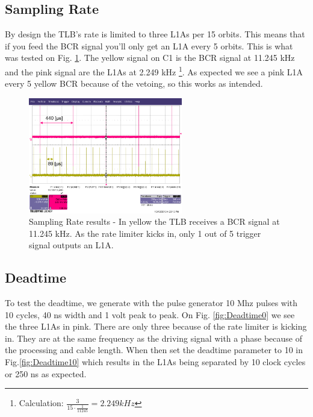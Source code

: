 \subsection{Sampling Rate}

By design the TLB's rate is limited to three L1As per 15 orbits. This means that if you feed the BCR signal you'll only get an L1A every 5 orbits. This is what was tested on Fig. \ref{fig:SamplingRate}. The yellow signal on C1 is the BCR signal at 11.245 kHz and the pink signal are the L1As at 2.249 kHz \footnote{Calculation: $\frac{3}{15\cdot\frac{1}{11245}}=2.249 kHz$}. As expected we see a pink L1A every 5 yellow BCR because of the vetoing, so this works as intended.

\begin{figure}[htbp!] 
\centering    
\includegraphics[width=0.6\textwidth]{SamplingRate.png}
\caption[Sampling Rate results]{Sampling Rate results - In yellow the TLB receives a BCR signal at 11.245 kHz. As the rate limiter kicks in, only 1 out of 5 trigger signal outputs an L1A.}
\label{fig:SamplingRate}
\end{figure}

\subsection{Deadtime}

To test the deadtime, we generate with the pulse generator 10 Mhz pulses with 10 cycles, 40 ns width and 1 volt peak to peak. On Fig. \ref{fig:Deadtime0} we see the three L1As in pink. There are only three because of the rate limiter is kicking in. They are at the same frequency as the driving signal with a phase because of the processing and cable length. When then set the deadtime parameter to 10 in Fig.\ref{fig:Deadtime10} which results in the L1As being separated by 10 clock cycles or 250 ns as expected.

